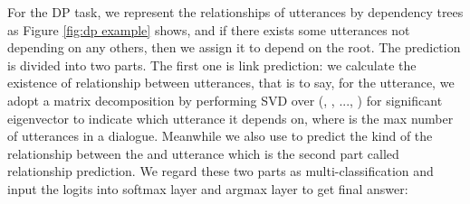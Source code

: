 \documentclass[11pt]{article}
\begin{document}
For the DP task, we represent the relationships of utterances by dependency trees as Figure \ref{fig:dp example} shows, and if there exists some utterances not depending on any others, then we assign it to depend on the root. The prediction is divided into two parts. The first one is link prediction: we calculate the existence of relationship between utterances, that is to say, for the  utterance, we adopt a matrix decomposition by performing SVD over (, , ..., ) for significant eigenvector to indicate which utterance it depends on, where  is the max number of utterances in a dialogue. Meanwhile we also use  to predict the kind of the relationship between the  and  utterance which is the second part called relationship prediction. We regard these two parts as multi-classification and input the logits into softmax layer and argmax layer to get final answer:
\end{document}
